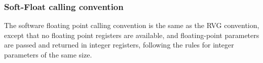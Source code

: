 \clearpage


\subsubsection{Soft-Float calling convention}

The software floating point calling convention is the same as the RVG
convention, except that no floating point registers are available, and
floating-point parameters are passed and returned in integer registers,
following the rules for integer parameters of the same size.

